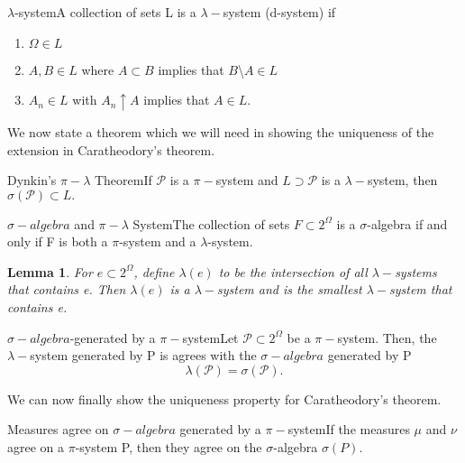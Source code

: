 \documentclass[twoside]{article}
\newtheorem{lemma}[theorem]{Lemma}
\newcommand{\sa}{\sigma-algebra}
\begin{document}
\begin{definition_exam}{$\lambda$-system}{}A collection of sets L is a $\lambda-$system (d-system) if 
\begin{enumerate}
\item $\Omega \in L$
\item $A, B \in L$ where $A \subset B$ implies that $B$\textbackslash $A \in L$
\item $A_n \in L$ with $A_n \uparrow A$ implies that $A \in L.$
\end{enumerate}
\end{definition_exam}

We now state a theorem which we will need in showing the uniqueness of the extension in Caratheodory's theorem.

\begin{theorem_exam}{Dynkin's $\pi-\lambda$ Theorem}{}If $\mathcal{P}$ is a $\pi-$system and $L \supset \mathcal{P}$ is a $\lambda-$system, then $\sigma(\mathcal{P}) \subset L.$
\end{theorem_exam}

\begin{proposition_exam}{$\sa$ and $\pi-\lambda$ System}{}The collection of sets $F \subset 2^{\Omega}$ is a $\sigma$-algebra if and only if F is both a $\pi$-system and a $\lambda$-system.
\end{proposition_exam}

\begin{lemma}For $e \subset 2^{\Omega}$, define $\lambda(e)$ to be the intersection of all $\lambda-$systems that contains e. Then $\lambda(e)$ is a $\lambda-$system and is the smallest $\lambda-$system that contains e.
\end{lemma}

\begin{theorem_exam}{$\sa$-generated by a $\pi-$system}{}Let $\mathcal{P} \subset 2^{\Omega}$ be a $\pi-$system. Then, the $\lambda-$system generated by P is agrees with the $\sa$ generated by P $$\lambda(\mathcal{P}) = \sigma(\mathcal{P}).$$
\end{theorem_exam}

We can now finally show the uniqueness property for Caratheodory's theorem.
\begin{theorem_exam}{Measures agree on $\sa$ generated by a $\pi-$system}{}If the measures $\mu$ and $\nu$ agree on a $\pi$-system P, then they agree on the $\sigma$-algebra $\sigma(P).$
\end{theorem_exam}
\end{document}
